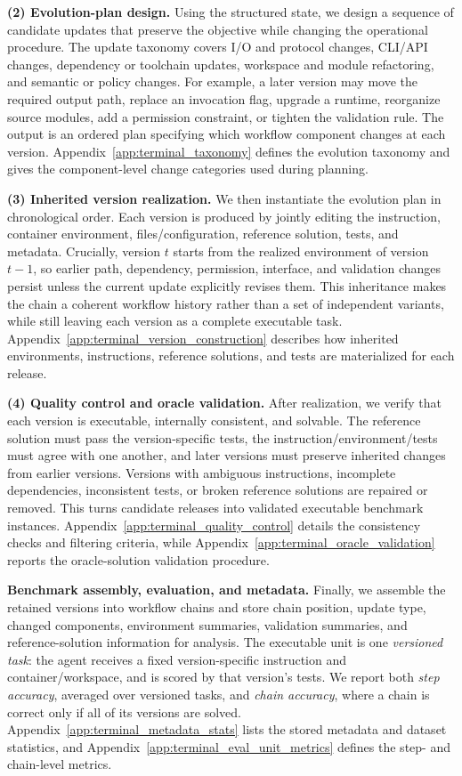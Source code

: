 \documentclass{article}
\begin{document}
\textbf{(2) Evolution-plan design.} \noindent
Using the structured state, we design a sequence of candidate updates that preserve the objective while changing the operational procedure. The update taxonomy covers I/O and protocol changes, CLI/API changes, dependency or toolchain updates, workspace and module refactoring, and semantic or policy changes. For example, a later version may move the required output path, replace an invocation flag, upgrade a runtime, reorganize source modules, add a permission constraint, or tighten the validation rule. The output is an ordered plan specifying which workflow component changes at each version. Appendix~\ref{app:terminal_taxonomy} defines the evolution taxonomy and gives the component-level change categories used during planning.

\textbf{(3) Inherited version realization.} \noindent
We then instantiate the evolution plan in chronological order. Each version is produced by jointly editing the instruction, container environment, files/configuration, reference solution, tests, and metadata. Crucially, version $t$ starts from the realized environment of version $t-1$, so earlier path, dependency, permission, interface, and validation changes persist unless the current update explicitly revises them. This inheritance makes the chain a coherent workflow history rather than a set of independent variants, while still leaving each version as a complete executable task. Appendix~\ref{app:terminal_version_construction} describes how inherited environments, instructions, reference solutions, and tests are materialized for each release.

\textbf{(4) Quality control and oracle validation.} \noindent
After realization, we verify that each version is executable, internally consistent, and solvable. The reference solution must pass the version-specific tests, the instruction/environment/tests must agree with one another, and later versions must preserve inherited changes from earlier versions. Versions with ambiguous instructions, incomplete dependencies, inconsistent tests, or broken reference solutions are repaired or removed. This turns candidate releases into validated executable benchmark instances. Appendix~\ref{app:terminal_quality_control} details the consistency checks and filtering criteria, while Appendix~\ref{app:terminal_oracle_validation} reports the oracle-solution validation procedure.

\textbf{Benchmark assembly, evaluation, and metadata.} \noindent
Finally, we assemble the retained versions into workflow chains and store chain position, update type, changed components, environment summaries, validation summaries, and reference-solution information for analysis. The executable unit is one \emph{versioned task}: the agent receives a fixed version-specific instruction and container/workspace, and is scored by that version's tests. We report both \emph{step accuracy}, averaged over versioned tasks, and \emph{chain accuracy}, where a chain is correct only if all of its versions are solved. Appendix~\ref{app:terminal_metadata_stats} lists the stored metadata and dataset statistics, and Appendix~\ref{app:terminal_eval_unit_metrics} defines the step- and chain-level metrics.
\end{document}
